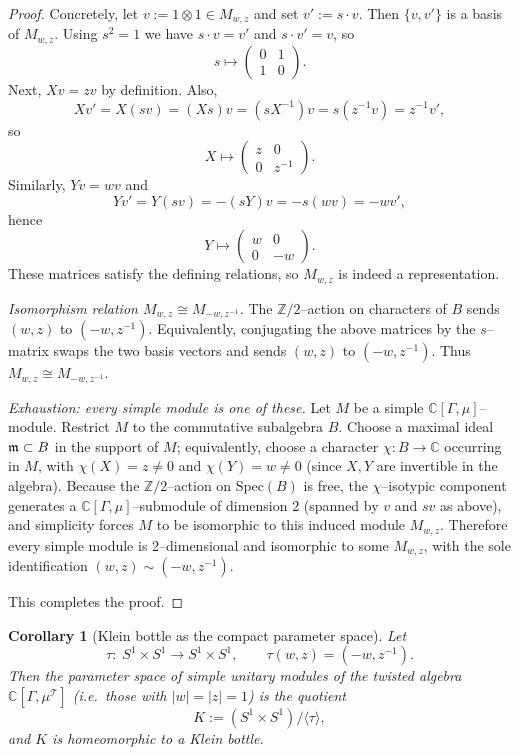 \documentclass[11pt]{amsart}
\newtheorem{corollary}[theorem]{Corollary}
\theoremstyle{remark}
\theoremstyle{definition}
\def\Spec{\mathrm{Spec}}
\newcommand{\Z}{\mathbb{Z}}
\newcommand{\C}{\mathbb{C}}
\def\cT{\mathcal{T}}
\begin{document}
\begin{proof}
Concretely, let $v:=1\otimes 1\in M_{w,z}$ and set $v':=s\cdot v$.
Then $\{v,v'\}$ is a basis of $M_{w,z}$.
Using $s^2=1$ we have $s\cdot v=v'$ and $s\cdot v'=v$, so
\[
s\mapsto \begin{pmatrix}0&1\\[2pt]1&0\end{pmatrix}.
\]
Next, $Xv=zv$ by definition.
Also,
\[
Xv' = X(sv) = (Xs)v = (sX^{-1})v = s(z^{-1}v)=z^{-1}v',
\]
so
\[
X\mapsto \begin{pmatrix} z&0\\[2pt]0&z^{-1}\end{pmatrix}.
\]
Similarly, $Yv=wv$ and
\[
Yv' = Y(sv) = -(sY)v = -s(wv)= -wv',
\]
hence
\[
Y\mapsto \begin{pmatrix} w&0\\[2pt]0&-w\end{pmatrix}.
\]
These matrices satisfy the defining relations, so $M_{w,z}$ is indeed a representation.

\medskip
\emph{Isomorphism relation $M_{w,z}\cong M_{-w,z^{-1}}$.}
The $\Z/2$--action on characters of $B$ sends $(w,z)$ to $(-w,z^{-1})$.
Equivalently, conjugating the above matrices by the $s$--matrix swaps the two basis vectors
and sends $(w,z)$ to $(-w,z^{-1})$.
Thus $M_{w,z}\cong M_{-w,z^{-1}}$.

\medskip
\emph{Exhaustion: every simple module is one of these.}
Let $M$ be a simple $\C[\Gamma,\mu]$--module.
Restrict $M$ to the commutative subalgebra $B$.
Choose a maximal ideal $\frak m\subset B$ in the support of $M$; equivalently,
choose a character $\chi:B\to\C$ occurring in $M$, with $\chi(X)=z\neq 0$ and $\chi(Y)=w\neq 0$
(since $X,Y$ are invertible in the algebra).
Because the $\Z/2$--action on $\Spec(B)$ is free, the $\chi$--isotypic component generates a
$\C[\Gamma,\mu]$--submodule of dimension $2$ (spanned by $v$ and $sv$ as above), and simplicity
forces $M$ to be isomorphic to this induced module $M_{w,z}$.
Therefore every simple module is $2$--dimensional and isomorphic to some $M_{w,z}$, with the
sole identification $(w,z)\sim(-w,z^{-1})$.

This completes the proof.
\end{proof}

\begin{corollary}[Klein bottle as the compact parameter space]\label{cor:Klein-compact}
Let
\[
\tau:\; S^1\times S^1 \longrightarrow S^1\times S^1,\qquad 
\tau(w,z)=(-w,z^{-1}).
\]
Then the parameter space of simple \emph{unitary} modules of the twisted algebra
$\C[\Gamma,\mu^\cT]$ (i.e.\ those with $|w|=|z|=1$) is the quotient
\[
K := (S^1\times S^1)/\langle\tau\rangle,
\]
and $K$ is homeomorphic to a Klein bottle.
\end{corollary}
\end{document}
